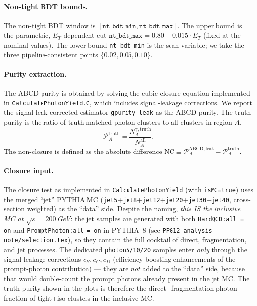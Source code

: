\documentclass[11pt]{article}
\begin{document}
\paragraph{Non-tight BDT bounds.}
The non-tight BDT window is $[\texttt{nt\_bdt\_min}, \texttt{nt\_bdt\_max}]$. The upper bound is the parametric, $E_T$-dependent cut $\texttt{nt\_bdt\_max} = 0.80 - 0.015 \cdot E_T$ (fixed at the nominal values). The lower bound \texttt{nt\_bdt\_min} is the scan variable; we take the three pipeline-consistent points $\{0.02, 0.05, 0.10\}$.

\paragraph{Purity extraction.}
The ABCD purity is obtained by solving the cubic closure equation implemented in \texttt{CalculatePhotonYield.C}, which includes signal-leakage corrections. We report the signal-leak-corrected estimator \texttt{gpurity\_leak} as the ABCD purity. The truth purity is the ratio of truth-matched photon clusters to all clusters in region $A$,
\begin{equation}
  \mathcal{P}^{\mathrm{truth}}_A = \frac{N^{\gamma,\mathrm{truth}}_A}{N^{\mathrm{all}}_A}.
\end{equation}
The non-closure is defined as the absolute difference $\mathrm{NC} \equiv \mathcal{P}^{\mathrm{ABCD,leak}}_A - \mathcal{P}^{\mathrm{truth}}_A$.

\paragraph{Closure input.}
The closure test as implemented in \texttt{CalculatePhotonYield} (with
\texttt{isMC=true}) uses the merged ``jet'' PYTHIA MC
(\texttt{jet5}+\texttt{jet8}+\texttt{jet12}+\texttt{jet20}+\texttt{jet30}+\texttt{jet40},
cross-section weighted) as the ``data'' side. Despite the naming,
\emph{this IS the inclusive MC at $\sqrt{s}=200$\,GeV}: the jet samples are
generated with both \texttt{HardQCD:all\,=\,on} and
\texttt{PromptPhoton:all\,=\,on} in PYTHIA~8 (see
\texttt{PPG12-analysis-note/selection.tex}), so they contain the full
cocktail of direct, fragmentation, and jet processes. The dedicated
\texttt{photon5/10/20} samples enter \emph{only} through the signal-leakage
corrections $c_B, c_C, c_D$ (efficiency-boosting enhancements of the
prompt-photon contribution) --- they are \emph{not} added to the ``data'' side,
because that would double-count the prompt photons already present in the
jet MC. The truth purity shown in the plots is therefore the
direct+fragmentation photon fraction of tight+iso clusters in the
inclusive MC.
\end{document}
